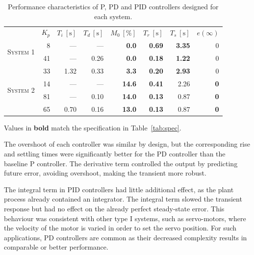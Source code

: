 \documentclass[a4paper,10pt,twocolumn]{article}
\begin{document}
\begin{table}[h!]
	\centering
	\footnotesize
	\begin{threeparttable}
		\caption{Performance characteristics of P, PD and PID controllers designed for each system.}
		\label{tab:pid}
		\setlength{\tabcolsep}{3pt}
		\begin{tabular}{@{}crrrrrrr@{}}
			\toprule
			&
				$K_p$ &
				$T_i~[\si{\second}]$ &
				$T_d~[\si{\second}]$ &
				$M_0~[\%]$ &
				$T_r~[\si{\second}]$ &
				$T_s~[\si{\second}]$ &
				$e(\infty)$ \\
			\cmidrule(r){2-4}\cmidrule(l){5-8}
			\multirow{2}{*}{
				\begin{sideways}\tiny
					\textsc{System 1}
				\end{sideways}
			}
			& 8 & --- & --- & 
				\textbf{0.0} & \textbf{0.69} & \textbf{3.35}  & 0 \\
			& 41 & --- & 0.26 &
				\textbf{0.0} & \textbf{0.18} & \textbf{1.22} & 0 \\
			& 33 & 1.32 & 0.33 &
				\textbf{3.3} & \textbf{0.20} & \textbf{2.93} & 0 \\
			\cmidrule{2-8}
			\multirow{2}{*}{
				\begin{sideways}\tiny
					\textsc{System 2}
				\end{sideways}
			}
			& 14 & --- & --- &
				\textbf{14.6} & \textbf{0.41} & 2.26 & \textbf{0} \\
			& 81 & --- & 0.10 &
				\textbf{14.0} & \textbf{0.13} & 0.87 & \textbf{0} \\
			& 65 & 0.70 & 0.16 &
				\textbf{13.0} & \textbf{0.13} & 0.87 & \textbf{0} \\
			\bottomrule
		\end{tabular}
		\begin{tablenotes}
			\item Values in \textbf{bold} match the specification in Table~\ref{tab:spec}.
		\end{tablenotes}
	\end{threeparttable}
\end{table}

The overshoot of each controller was similar by design, but the corresponding rise and settling times were significantly better for the PD controller than the baseline P controller. 
The derivative term controlled the output by predicting future error, avoiding overshoot, making the transient more robust.

The integral term in PID controllers had little additional effect, as the plant process already contained an integrator. The integral term slowed the transient response but had no effect on the already perfect steady-state error. This behaviour was consistent with other type I systems, such as servo-motors, where the velocity of the motor is varied in order to set the servo position. For such applications, PD controllers are common as their decreased complexity results in comparable or better performance.
\end{document}
